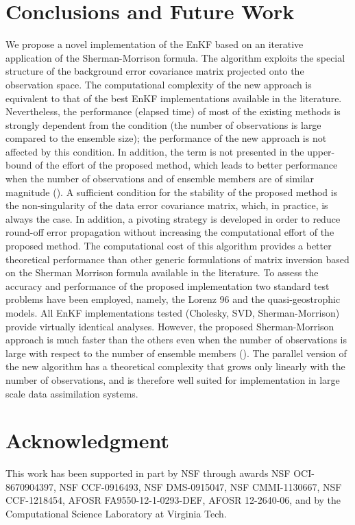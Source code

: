 \documentclass[12pt]{article}
\begin{document}
\section{Conclusions and Future Work}\label{sec:conclusions}


We propose a novel implementation of the EnKF based on an iterative application of the Sherman-Morrison formula. The algorithm exploits the special structure of the background error covariance matrix projected onto the observation space. The computational complexity of the new approach is equivalent to that of the best EnKF implementations  available in the literature. Nevertheless, the performance (elapsed time) of most of the existing methods is strongly dependent from the condition  (the number of observations is large compared to the ensemble size); the performance of the new approach is not affected by this condition. In addition, the term  is not presented in the upper-bound of the effort of the proposed method, which leads to better performance when the number of observations and of ensemble members are of similar magnitude (). A sufficient condition for the stability of the proposed method is the non-singularity of the data error covariance matrix, which, in practice, is always the case. In addition, a pivoting strategy is developed in order to reduce round-off error propagation without increasing the computational effort of the proposed method. The computational cost of this algorithm provides a better theoretical performance than other generic formulations of matrix inversion based on the Sherman Morrison formula available in the literature. To assess the accuracy and performance of the proposed implementation two standard test problems have been employed, namely, the Lorenz 96 and the quasi-geostrophic models. All EnKF implementations tested (Cholesky, SVD, Sherman-Morrison) provide virtually identical analyses. However, the proposed Sherman-Morrison approach is much faster than the others even when the number of observations is large with respect to the number of ensemble members (). The parallel version of the new algorithm has a theoretical complexity that grows only linearly with the number of observations, and is therefore well suited for implementation in large scale data assimilation systems.


\section*{Acknowledgment}
This work has been supported in part by NSF through awards NSF OCI-8670904397, NSF CCF-0916493, NSF DMS-0915047, NSF CMMI-1130667, NSF CCF-1218454, AFOSR FA9550-12-1-0293-DEF, AFOSR 12-2640-06, and by the Computational Science Laboratory at Virginia Tech.
\end{document}
